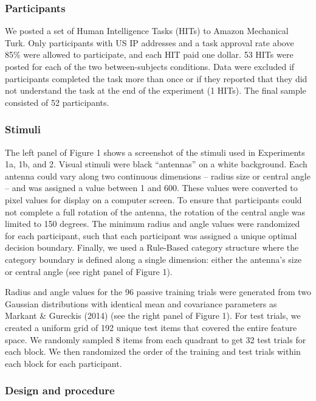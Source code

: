 \documentclass[10pt, letterpaper]{article}
\begin{document}
\subsubsection{Participants}\label{participants}

We posted a set of Human Intelligence Tasks (HITs) to Amazon Mechanical
Turk. Only participants with US IP addresses and a task approval rate
above 85\% were allowed to participate, and each HIT paid one dollar. 53
HITs were posted for each of the two between-subjects conditions. Data
were excluded if participants completed the task more than once or if
they reported that they did not understand the task at the end of the
experiment (1 HITs). The final sample consisted of 52 participants.

\subsubsection{Stimuli}\label{stimuli}

The left panel of Figure 1 shows a screenshot of the stimuli used in
Experiments 1a, 1b, and 2. Visual stimuli were black ``antennas'' on a
white background. Each antenna could vary along two continuous
dimensions -- radius size or central angle -- and was assigned a value
between 1 and 600. These values were converted to pixel values for
display on a computer screen. To ensure that participants could not
complete a full rotation of the antenna, the rotation of the central
angle was limited to 150 degrees. The minimum radius and angle values
were randomized for each participant, such that each participant was
assigned a unique optimal decision boundary. Finally, we used a
Rule-Based category structure where the category boundary is defined
along a single dimension: either the antenna's size or central angle
(see right panel of Figure 1).

Radius and angle values for the 96 passive training trials were
generated from two Gaussian distributions with identical mean and
covariance parameters as Markant \& Gureckis (2014) (see the right panel
of Figure 1). For test trials, we created a uniform grid of 192 unique
test items that covered the entire feature space. We randomly sampled 8
items from each quadrant to get 32 test trials for each block. We then
randomized the order of the training and test trials within each block
for each participant.

\subsubsection{Design and procedure}\label{design-and-procedure}
\end{document}
